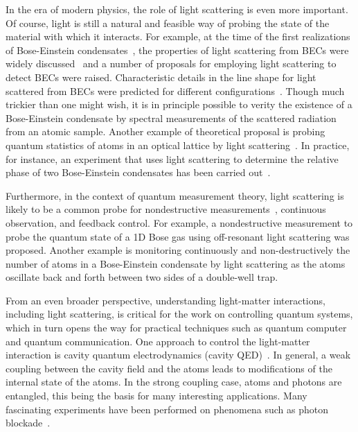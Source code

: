 In the era of modern physics, the role of light scattering is even more important. Of course, light is still a natural and feasible way of probing the state of the material with which it interacts. For example, at the time of the first realizations of Bose-Einstein condensates~\cite{Anderson14071995,PhysRevLett.75.3969}, the properties of light scattering from BECs were widely discussed~\cite{PhysRevA.43.6444,PhysRevA.51.3896,PhysRevA.52.3033,PhysRevLett.71.1339}  and a number of proposals for employing light scattering to detect BECs were raised. Characteristic details in the line shape for light scattered from BECs were predicted for different configurations~\cite{PhysRevLett.72.2375,PhysRevA.50.R3565,PhysRevLett.75.1927,PhysRevLett.76.1774,PhysRevA.54.R2543}. Though much trickier than one might wish, it is in principle possible to verity the existence of a Bose-Einstein condensate by spectral measurements of the scattered radiation from an atomic sample. Another example of theoretical proposal is probing quantum statistics of atoms in an optical lattice by light scattering~\cite{PhysRevA.76.053618}. In practice, for instance, an experiment that uses light scattering to determine the relative phase of two Bose-Einstein condensates has been carried out~\cite{Saba25032005}.

Furthermore, in the context of quantum measurement theory, light scattering is likely to be a common probe for nondestructive measurements~\cite{RevModPhys.68.1}, continuous observation, and feedback control. For example, a nondestructive measurement to probe the quantum state of a 1D Bose gas using off-resonant light scattering was proposed\cite{PhysRevLett.107.270403}. Another example is monitoring continuously and non-destructively the number of atoms in a Bose-Einstein condensate by light scattering as the atoms oscillate back and forth between two sides of a double-well trap\cite{NJP.JJ}.

From an even broader perspective, understanding light-matter interactions, including light scattering, is critical for the work on controlling quantum systems, which in turn opens the way for practical techniques such as quantum computer and quantum communication. One approach to control the light-matter interaction is cavity quantum electrodynamics (cavity QED)~\cite{0034-4885-69-5-R02}. In general, a weak coupling between the cavity field and the atoms leads to modifications of the internal state of the atoms. In the strong coupling case, atoms and photons are entangled, this being the basis for many interesting applications.  Many fascinating experiments have been performed on  phenomena such as  photon blockade~\cite{photon_blockade}.

